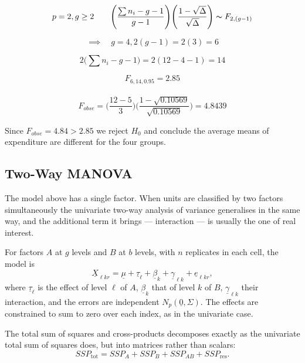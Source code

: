 \documentclass[11pt,a4paper]{article}
\theoremstyle{definition}
\begin{document}
$$p=2,  g\geq 2\qquad  \Bigg(\frac{\sum n_i-g-1}{g-1}\Bigg)\Bigg(\frac{1-\sqrt{\Delta}}{\sqrt{\Delta}}\Bigg)\thicksim F_{2,(g-1)}$$

$$\implies\quad  g=4,  2(g-1)=2(3)=6$$

$$2\big(\sum n_i -g-1\big) = 2 (12-4-1) =14$$

$$F_{6,14,0.95}=2.85$$\\

$$F_{obse} = \Bigg(\frac{12-5}{3}\Bigg)\Bigg(\frac{1-\sqrt{0.10569}}{\sqrt{0.10569}}\Bigg)=4.8439$$

Since $F_{obse} = 4.84>2.85$ we reject $H_0$ and conclude the average means of expenditure are different for the four groups.\\






















\pagebreak
\subsection{Two-Way MANOVA}

The model above has a single factor. When units are classified by two factors
simultaneously the univariate two-way analysis of variance generalises in the
same way, and the additional term it brings --- interaction --- is usually the
one of real interest.

For factors $A$ at $g$ levels and $B$ at $b$ levels, with $n$ replicates in each
cell, the model is
$$\underline{X}_{\ell k r} = \underline{\mu} + \underline{\tau}_{\ell}
+ \underline{\beta}_{k} + \underline{\gamma}_{\ell k} + \underline{e}_{\ell k r},$$
where $\underline{\tau}_\ell$ is the effect of level $\ell$ of $A$,
$\underline{\beta}_k$ that of level $k$ of $B$, $\underline{\gamma}_{\ell k}$
their interaction, and the errors are independent
$N_p\left(\underline{0},\Sigma\right)$. The effects are constrained to sum to
zero over each index, as in the univariate case.

The total sum of squares and cross-products decomposes exactly as the univariate
total sum of squares does, but into matrices rather than scalars:
$$SSP_{\text{tot}} = SSP_{A} + SSP_{B} + SSP_{AB} + SSP_{\text{res}} .$$
\end{document}
